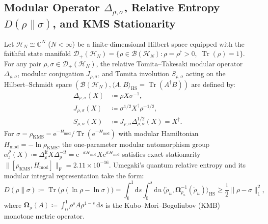 \documentclass[11pt,a4paper,reqno]{article}
\DeclareMathOperator{\Tr}{Tr}
\theoremstyle{plain}
\theoremstyle{definition}
\theoremstyle{remark}
\numberwithin{equation}{section}
\begin{document}
\subsection{Modular Operator \texorpdfstring{$\Delta_{\rho,\sigma}$}{Delta}, Relative Entropy \texorpdfstring{$D(\rho\parallel\sigma)$}{D}, and KMS Stationarity}
Let $\mathcal{H}_N \cong \mathbb{C}^N$ ($N < \infty$) be a finite-dimensional Hilbert space equipped with the faithful state manifold $\mathcal{D}_+(\mathcal{H}_N) = \{\rho \in \mathcal{B}(\mathcal{H}_N) : \rho = \rho^\dagger > 0,\; \Tr(\rho) = 1\}$. For any pair $\rho, \sigma \in \mathcal{D}_+(\mathcal{H}_N)$, the relative Tomita--Takesaki modular operator $\Delta_{\rho,\sigma}$, modular conjugation $J_{\rho,\sigma}$, and Tomita involution $S_{\rho,\sigma}$ acting on the Hilbert--Schmidt space $(\mathcal{B}(\mathcal{H}_N), \langle A, B\rangle_{\mathrm{HS}} = \Tr(A^\dagger B))$ are defined by:
\begin{align}
\label{eq:tomita_modular_op}
\Delta_{\rho,\sigma}(X) &\coloneqq \rho X \sigma^{-1}, \\
\label{eq:tomita_modular_conj}
J_{\rho,\sigma}(X) &\coloneqq \sigma^{1/2} X^\dagger \rho^{-1/2}, \\
\label{eq:tomita_involution}
S_{\rho,\sigma}(X) &\coloneqq J_{\rho,\sigma}\Delta_{\rho,\sigma}^{1/2}(X) = X^\dagger.
\end{align}
For $\sigma = \rho_{\mathrm{KMS}} = \mathrm{e}^{-H_{\mathrm{mod}}} / \Tr(\mathrm{e}^{-H_{\mathrm{mod}}})$ with modular Hamiltonian $H_{\mathrm{mod}} = -\ln \rho_{\mathrm{KMS}}$, the one-parameter modular automorphism group $\alpha_t^\rho(X) \coloneqq \Delta_\rho^{\mathrm{i}t} X \Delta_\rho^{-\mathrm{i}t} = \mathrm{e}^{-\mathrm{i}t H_{\mathrm{mod}}} X \mathrm{e}^{\mathrm{i}t H_{\mathrm{mod}}}$ satisfies exact stationarity $\|[ \rho_{\mathrm{KMS}}, H_{\mathrm{mod}} ]\|_{\mathrm{F}} = 2.11 \times 10^{-16}$. Umegaki's quantum relative entropy and its modular integral representation take the form:
\begin{equation}
\label{eq:umegaki_entropy}
D(\rho \parallel \sigma) \coloneqq \Tr\big(\rho (\ln \rho - \ln \sigma)\big) = \int_0^1 \mathrm{d}s \int_0^s \mathrm{d}u \, \langle \dot{\rho}_u, \bm{\Omega}_{\rho_u}^{-1}(\dot{\rho}_u) \rangle_{\mathrm{HS}} \ge \frac{1}{2}\|\rho - \sigma\|_1^2,
\end{equation}
where $\bm{\Omega}_\rho(A) \coloneqq \int_0^1 \rho^s A \rho^{1-s}\,\mathrm{d}s$ is the Kubo--Mori--Bogoliubov (KMB) monotone metric operator.
\end{document}
